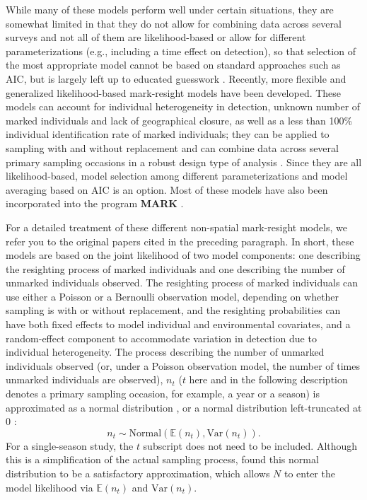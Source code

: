 While many of these models perform well under certain situations, they
are somewhat limited in that they do not allow for combining data
across several surveys \citep{mcclintock_etal:2006} and not all of
them are likelihood-based or allow for different parameterizations
(e.g., including a time effect on detection), so that selection of the
most appropriate model cannot be based on standard approaches such as
AIC, but is largely left up to educated guesswork
\citep{mcclintock_etal:2006}. Recently, more flexible and generalized
likelihood-based mark-resight models have been developed. These models
can account for individual heterogeneity in detection, unknown number
of marked individuals and lack of geographical closure, as well as a
less than 100\% individual identification rate of marked individuals;
they can be applied to sampling with and without replacement and can
combine data across several primary sampling occasions in a robust
design type of analysis
\citep{mcclintock_etal:2009biometrics,mcclintock_etal:2009mdp}. Since
they are all likelihood-based, model selection among different
parameterizations and model averaging based on AIC is an option. Most
of these models have also been incorporated into the program {\bf
  MARK} \citep{mcclintock_white:2010}.

For a detailed treatment of these different non-spatial mark-resight
models, we refer you to the original papers cited in the preceding
paragraph. In short, these models are based on the joint likelihood of
two model components: one describing the resighting process of marked
individuals and one describing the number of unmarked individuals
observed.  The resighting process of marked individuals can use either
a Poisson or a Bernoulli observation model, depending on whether
sampling is with or without replacement, and the resighting
probabilities can have both fixed effects to model individual and
environmental covariates, and a random-effect component to accommodate
variation in detection due to individual heterogeneity.  The process
describing the number of unmarked individuals observed (or, under a
Poisson observation model, the number of times unmarked individuals
are observed), $n_t$ ($t$ here and in the following description
denotes a primary sampling occasion, for example, a year or a season)
is approximated as a normal distribution
\citep{mcclintock_etal:2006}, or a normal distribution left-truncated
at 0 \citep{mcclintock_etal:2009biometrics}:
\[
n_t \sim \mbox{Normal} (\mathbb{E}(n_t), \mbox{Var}(n_t)).
\]
For a single-season study, the $t$ subscript does not need to be
included.  Although this is a simplification of the actual sampling
process, \citet{mcclintock_etal:2006} found this normal distribution
to be a satisfactory approximation, which allows $N$ to enter the
model likelihood via $\mathbb{E}(n_t)$ and $\mbox{Var}(n_t)$.

